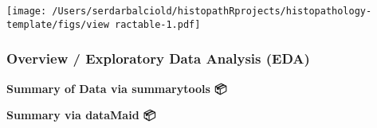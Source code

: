 \documentclass[
]{article}
\newenvironment{Shaded}{\begin{snugshade}}{\end{snugshade}}
\newcommand{\ControlFlowTok}[1]{\textcolor[rgb]{0.12,0.11,0.11}{\textbf{#1}}}
\newcommand{\DataTypeTok}[1]{\textcolor[rgb]{0.00,0.34,0.68}{#1}}
\newcommand{\KeywordTok}[1]{\textcolor[rgb]{0.12,0.11,0.11}{\textbf{#1}}}
\newcommand{\NormalTok}[1]{\textcolor[rgb]{0.12,0.11,0.11}{#1}}
\newcommand{\OperatorTok}[1]{\textcolor[rgb]{0.12,0.11,0.11}{#1}}
\newcommand{\StringTok}[1]{\textcolor[rgb]{0.75,0.01,0.01}{#1}}
\begin{document}
\texttt{[image: /Users/serdarbalciold/histopathRprojects/histopathology-template/figs/view ractable-1.pdf]}

\hypertarget{overview-exploratory-data-analysis-eda}{%
\subsubsection{Overview / Exploratory Data Analysis
(EDA)}\label{overview-exploratory-data-analysis-eda}}

\textbf{Summary of Data via summarytools 📦}

\begin{Shaded}
\end{Shaded}

\begin{Shaded}
\end{Shaded}

\textbf{Summary via dataMaid 📦}
\end{document}

